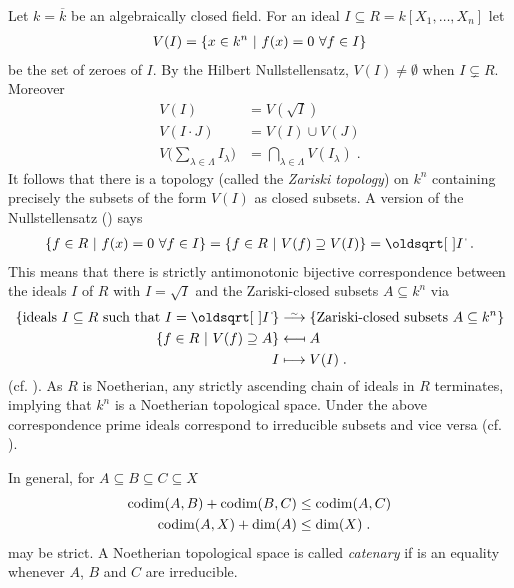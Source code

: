 \documentclass[a4paper,parskip=half,numbers=enddot, DIV=12, headheight=30pt]{scrreprt}
\begin{document}
\begin{example}
	Let $k =\overline{k}$ be an algebraically closed field. For an ideal $I\subseteq R = k[X_1,\ldots,X_n]$ let 
	\begin{align*}
	V(I) = \left\{x\in k^n\ \middle|\  f(x)=0\ \forall f\in I\right\}
	\end{align*}
	be the set of zeroes of $I$. By the Hilbert Nullstellensatz, $V(I) \neq \emptyset$ when $I\subsetneq R$. Moreover 
	\begin{align*}
	V(I)& = V\left(\sqrt{I}\right)\\
	V(I\cdot J ) &= V(I) \cup V(J)\\
	V\bigg(\sum_{\lambda\in\Lambda} I_\lambda\bigg) &=\bigcap_{\lambda\in\Lambda} V(I_\lambda)\;.
	\end{align*}
	It follows that there is a topology (called the \emph{Zariski topology}) on $k^n$ containing precisely the subsets of the form $V(I)$ as closed subsets. A version of the Nullstellensatz (\cite[Proposition~1.7.1]{alg1}) says
	\begin{align*}
	\left\{f\in R\st f(x) = 0\ \forall f\in I\right\} = \left\{f\in R\st V(f)\supseteq V(I)\right\} = \sqrt{I}\;.
	\end{align*}
	This means that there is strictly antimonotonic bijective correspondence between the ideals $I$ of $R$ with $I=\sqrt{I}$ and the Zariski-closed subsets $A\subseteq k^n$ via
	\begin{align*}
	\left\{\text{ideals }I\subseteq R\text{ such that }I=\sqrt I\right\}&\isomorphism\left\{\text{Zariski-closed subsets }A\subseteq k^n\right\}\\
	\left\{f\in R\st V(f)\supseteq A\right\} &\longmapsfrom A\\
	I&\longmapsto V(I)\;.
	\end{align*}
	(cf. \cite[Remark~2.1.1]{alg1}). As $R$ is Noetherian, any strictly ascending chain of ideals in $R$ terminates, implying that $k^n$ is a Noetherian topological space. Under the above correspondence prime ideals correspond to irreducible subsets and vice versa (cf. \cite[Proposition~2.1.2]{alg1}).  
\end{example}
\begin{rem}
	In general, for $A\subseteq B\subseteq C\subseteq X$
	\begin{align}\lbl{eq:codimIneq}
	\codim(A,B) +\codim(B,C) &\leq \codim(A,C) \\ 
	\codim(A,X)+\dim (A) &\leq \dim (X)\;.\lbl{eq:codimIneq2}
	\end{align}
	may be strict. A Noetherian topological space is called \emph{catenary} if  is an equality whenever $A$, $B$ and $C$ are irreducible.
\end{rem}
\end{document}
